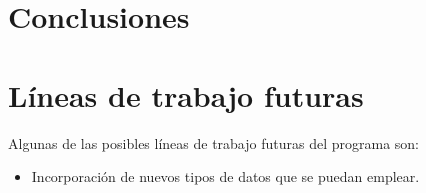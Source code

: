 
\section{Conclusiones}

\section{Líneas de trabajo futuras}
Algunas de las posibles líneas de trabajo futuras del programa son:
\begin{itemize}
	\item Incorporación de nuevos tipos de datos que se puedan emplear. 
\end{itemize}